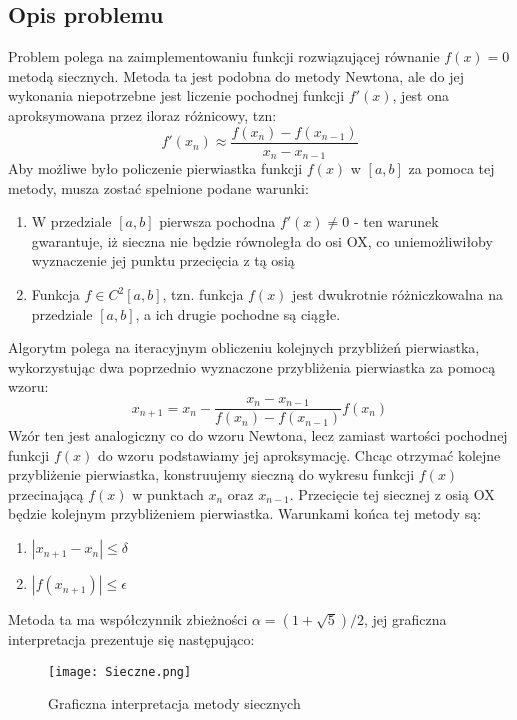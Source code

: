 \documentclass{article}
\begin{document}
\subsection{Opis problemu}
Problem polega na zaimplementowaniu funkcji rozwiązującej równanie $f(x) = 0$ metodą siecznych. Metoda ta jest podobna do metody Newtona, ale do jej wykonania niepotrzebne jest liczenie pochodnej funkcji $f'(x)$, jest ona aproksymowana przez iloraz różnicowy, tzn:
$$ f'(x_n) \approx \frac{f(x_n) - f(x_{n-1})}{x_n - x_{n-1}} $$
Aby możliwe było policzenie pierwiastka funkcji $f(x)$ w $[a, b]$ za pomoca tej metody,
musza zostać spelnione podane warunki:
\begin{enumerate}
    \item W przedziale $[a,b]$ pierwsza pochodna $f'(x) \neq 0$ - ten warunek gwarantuje, iż sieczna nie będzie równoległa do osi OX, co uniemożliwiłoby wyznaczenie jej punktu przecięcia z tą osią
    \item Funkcja $f \in C^2[a,b]$, tzn. funkcja $f(x)$ jest dwukrotnie różniczkowalna na przedziale $[a,b]$, a ich drugie pochodne są ciągłe.
\end{enumerate}
Algorytm polega na iteracyjnym obliczeniu kolejnych przybliżeń pierwiastka, wykorzystując dwa poprzednio wyznaczone przybliżenia pierwiastka za pomocą wzoru:
$$ x_{n+1} = x_n - \frac{x_n - x_{n-1}}{f(x_n) - f(x_{n-1})}f(x_n) $$
Wzór ten jest analogiczny co do wzoru Newtona, lecz zamiast wartości pochodnej funkcji $f(x)$ do wzoru podstawiamy jej aproksymację. Chcąc otrzymać kolejne przybliżenie pierwiastka, konstruujemy sieczną do wykresu funkcji $f(x)$ przecinającą $f(x)$ w punktach $x_n$ oraz $x_{n-1}$. Przecięcie tej siecznej z osią OX będzie kolejnym przybliżeniem pierwiastka. Warunkami końca tej metody są:
\begin{enumerate}
    \item $|x_{n+1} - x_n| \leq \delta$
    \item $|f(x_{n+1})| \leq \epsilon$
\end{enumerate}
Metoda ta ma współczynnik zbieżności $\alpha = (1 + \sqrt{5})/2$, jej graficzna interpretacja prezentuje się następująco:

\begin{figure}[H] 
\centering
\texttt{[image: Sieczne.png]}
\caption{Graficzna interpretacja metody siecznych}
\label{Sieczne}
\end{figure}
\newpage
\end{document}
